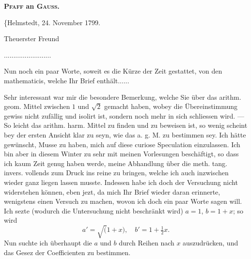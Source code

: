 \begingroup
\NoSourceHead
{}
\begin{center}\Large\bfseries{}\end{center}
\begin{center}\large\bfseries\textsc{Pfaff} an \textsc{Gauss}.\end{center}
\begin{flushright}\{Helmstedt, 24. November 1799.\end{flushright}
\begin{center}Theuerster Freund\end{center}
\noindent\hspace*{1.2em}.\quad .\quad .\quad .\quad .\quad .\quad .\quad .\quad .\quad .\quad .\quad .\quad .\quad .\quad .\quad .\quad .\quad .\quad .\quad .\quad .\quad .\quad .\quad .\quad .\par
\noindent Nun noch ein paar Worte, soweit es die Kürze der Zeit gestattet, von den mathematicis, welche Ihr Brief enthält.\quad .\quad .\quad .\quad .\quad .

\par\indent Sehr interessant war mir die besondere Bemerkung, welche Sie über das arithm. geom. Mittel zwischen $1$ und $\surd2$ gemacht haben, wobey die Übereinstimmung gewiss nicht zufällig und isolirt ist, sondern noch mehr in sich schliessen wird. — So leicht das arithm. harm. Mittel zu finden und zu beweisen ist, so wenig scheint bey der ersten Ansicht klar zu seyn, wie das a. g. M. zu bestimmen sey. Ich hätte gewünscht, Musse zu haben, mich auf diese curiose Speculation einzulassen. Ich bin aber in diesem Winter zu sehr mit meinen Vorlesungen beschäftigt, so dass ich kaum Zeit genug haben werde, meine Abhandlung über die meth. tang. invers. vollends zum Druck ins reine zu bringen, welche ich auch inzwischen wieder ganz liegen lassen musste. Indessen habe ich doch der Versuchung nicht widerstehen können, eben jezt, da mich Ihr Brief wieder daran erinnerte, wenigstens einen Versuch zu machen, wovon ich doch ein paar Worte sagen will. Ich sezte (wodurch die Untersuchung nicht beschränkt wird) $a=1$, $b=1+x$; so wird
\[
a'=\surd(1+x),\quad b'=1+\tfrac12x.
\]
\clearpage
{}
\noindent Nun suchte ich überhaupt die $a$ und $b$ durch Reihen nach $x$ auszudrücken, und das Gesez der Coefficienten zu bestimmen.

